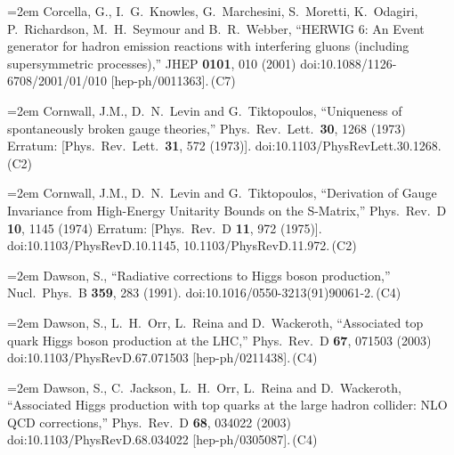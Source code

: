 \documentclass[letter,12pt]{article}
\def\xbibitem#1#2#3{\noindent\hangindent=2em #2\,(#3)}
\begin{document}
\xbibitem{Corcella:2000bw}{Corcella, G., I.~G.~Knowles, G.~Marchesini, S.~Moretti, K.~Odagiri, P.~Richardson, M.~H.~Seymour and B.~R.~Webber,
  ``HERWIG 6: An Event generator for hadron emission reactions with interfering gluons (including supersymmetric processes),''
  JHEP {\bf 0101}, 010 (2001)
  doi:10.1088/1126-6708/2001/01/010
  [hep-ph/0011363].}{C7}
  
\xbibitem{Cornwall:1973tb}{Cornwall, J.M., D.~N.~Levin and G.~Tiktopoulos,
  ``Uniqueness of spontaneously broken gauge theories,''
  Phys.\ Rev.\ Lett.\  {\bf 30}, 1268 (1973)
  Erratum: [Phys.\ Rev.\ Lett.\  {\bf 31}, 572 (1973)].
  doi:10.1103/PhysRevLett.30.1268.}{C2}
  
\xbibitem{Cornwall:1974km}{Cornwall, J.M., D.~N.~Levin and G.~Tiktopoulos,
  ``Derivation of Gauge Invariance from High-Energy Unitarity Bounds on the S-Matrix,''
  Phys.\ Rev.\ D {\bf 10}, 1145 (1974)
  Erratum: [Phys.\ Rev.\ D {\bf 11}, 972 (1975)].
  doi:10.1103/PhysRevD.10.1145, 10.1103/PhysRevD.11.972.}{C2}
  
\xbibitem{Dawson:1990zj}{Dawson, S.,
  ``Radiative corrections to Higgs boson production,''
  Nucl.\ Phys.\ B {\bf 359}, 283 (1991).
  doi:10.1016/0550-3213(91)90061-2.}{C4}

\xbibitem{Dawson:2002tg}{Dawson, S., L.~H.~Orr, L.~Reina and D.~Wackeroth,
  ``Associated top quark Higgs boson production at the LHC,''
  Phys.\ Rev.\ D {\bf 67}, 071503 (2003)
  doi:10.1103/PhysRevD.67.071503
  [hep-ph/0211438].}{C4}
  
\xbibitem{Dawson:2003zu}{Dawson, S., C.~Jackson, L.~H.~Orr, L.~Reina and D.~Wackeroth,
  ``Associated Higgs production with top quarks at the large hadron collider: NLO QCD corrections,''
  Phys.\ Rev.\ D {\bf 68}, 034022 (2003)
  doi:10.1103/PhysRevD.68.034022
  [hep-ph/0305087].}{C4}
  
\end{document}
